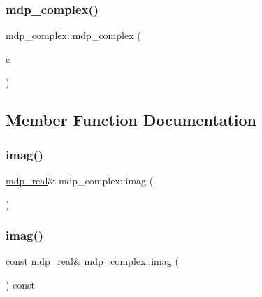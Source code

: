 \mbox{\label{classmdp__complex_a99833fa0efd97e5a5d95afd237ac5c7c}} 
\subsubsection{\texorpdfstring{mdp\+\_\+complex()}{mdp\_complex()}\hspace{0.1cm}{\footnotesize\ttfamily [2/2]}}
{\footnotesize\ttfamily mdp\+\_\+complex\+::mdp\+\_\+complex (\begin{DoxyParamCaption}\item[{const \hyperlink{classmdp__complex}{mdp\+\_\+complex} \&}]{c }\end{DoxyParamCaption})\hspace{0.3cm}{\ttfamily [inline]}}



\subsection{Member Function Documentation}
\mbox{\label{classmdp__complex_a6426bc039248f24201db0e4344bf2409}} 
\subsubsection{\texorpdfstring{imag()}{imag()}\hspace{0.1cm}{\footnotesize\ttfamily [1/2]}}
{\footnotesize\ttfamily \hyperlink{mdp__global__vars_8h_a69d96b74c791e0bbdb888b3913a69450}{mdp\+\_\+real}\& mdp\+\_\+complex\+::imag (\begin{DoxyParamCaption}{ }\end{DoxyParamCaption})\hspace{0.3cm}{\ttfamily [inline]}}

\mbox{\label{classmdp__complex_ac44d1a0643e83891df5bfa32d0582e04}} 
\subsubsection{\texorpdfstring{imag()}{imag()}\hspace{0.1cm}{\footnotesize\ttfamily [2/2]}}
{\footnotesize\ttfamily const \hyperlink{mdp__global__vars_8h_a69d96b74c791e0bbdb888b3913a69450}{mdp\+\_\+real}\& mdp\+\_\+complex\+::imag (\begin{DoxyParamCaption}{ }\end{DoxyParamCaption}) const\hspace{0.3cm}{\ttfamily [inline]}}

